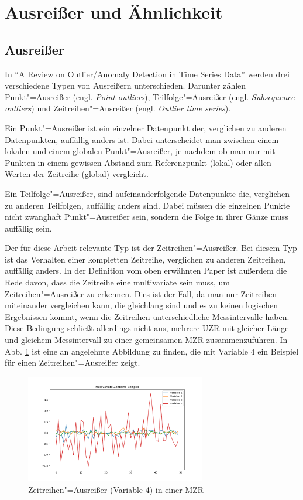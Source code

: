 \section{Ausreißer und Ähnlichkeit}
\subsection{Ausreißer}
In "`A Review on Outlier/Anomaly Detection in Time Series Data"' \cite[Ch. 2.2]{aauj2021} werden drei verschiedene Typen von Ausreißern unterschieden. Darunter zählen Punkt"=Ausreißer (engl. \textit{Point outliers}), Teilfolge"=Ausreißer (engl. \textit{Subsequence outliers}) und Zeitreihen"=Ausreißer (engl. \textit{Outlier time series}).

Ein Punkt"=Ausreißer ist ein einzelner Datenpunkt der, verglichen zu anderen Datenpunkten, auffällig anders ist. Dabei unterscheidet man zwischen einem lokalen und einem globalen Punkt"=Ausreißer, je nachdem ob man nur mit Punkten in einem gewissen Abstand zum Referenzpunkt (lokal) oder allen Werten der Zeitreihe (global) vergleicht.

Ein Teilfolge"=Ausreißer, sind aufeinanderfolgende Datenpunkte die, verglichen zu anderen Teilfolgen, auffällig anders sind. Dabei müssen die einzelnen Punkte nicht zwanghaft Punkt"=Ausreißer sein, sondern die Folge in ihrer Gänze muss auffällig sein. 

Der für diese Arbeit relevante Typ ist der Zeitreihen"=Ausreißer. Bei diesem Typ ist das Verhalten einer kompletten Zeitreihe, verglichen zu anderen Zeitreihen, auffällig anders. In der Definition vom oben erwähnten Paper \cite{aauj2021} ist außerdem die Rede davon, dass die Zeitreihe eine multivariate sein muss, um Zeitreihen"=Ausreißer zu erkennen. Dies ist der Fall, da man nur Zeitreihen miteinander vergleichen kann, die gleichlang sind und es zu keinen logischen Ergebnissen kommt, wenn die Zeitreihen unterschiedliche Messintervalle haben. Diese Bedingung schließt allerdings nicht aus, mehrere \acs{UZR} mit gleicher Länge und gleichem Messintervall zu einer gemeinsamen \acs{MZR} zusammenzuführen. In Abb. \ref{fig:ZeitreihenAusreisserBeispiel} ist eine an \cite[Fig. 5]{aauj2021} angelehnte Abbildung zu finden, die mit Variable 4 ein Beispiel für einen Zeitreihen"=Ausreißer zeigt.
\begin{figure}[bth] 
  \centering
  \includegraphics[width=0.7\textwidth]{Graphics/TimeSeriesOutlierExample.png}
  \caption{Zeitreihen"=Ausreißer (Variable 4) in einer \acs{MZR}}
  \label{fig:ZeitreihenAusreisserBeispiel}
\end{figure}
